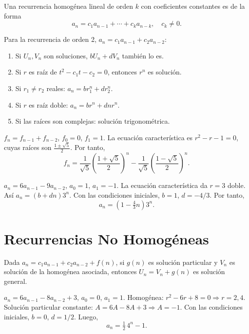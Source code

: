 \begin{definicion}
Una recurrencia homogénea lineal de orden $k$ con coeficientes constantes es de la forma
\[
a_n = c_1 a_{n-1} + \cdots + c_k a_{n-k}, \quad c_k \neq 0.
\]
\end{definicion}

\begin{teorema}
Para la recurrencia de orden 2, $a_n = c_1 a_{n-1} + c_2 a_{n-2}$:
\begin{enumerate}
  \item Si $U_n, V_n$ son soluciones, $bU_n + dV_n$ también lo es.
  \item Si $r$ es raíz de $t^2 - c_1 t - c_2 = 0$, entonces $r^n$ es solución.
  \item Si $r_1 \neq r_2$ reales: $a_n = b r_1^n + d r_2^n$.
  \item Si $r$ es raíz doble: $a_n = b r^n + d n r^n$.
  \item Si las raíces son complejas: solución trigonométrica.
\end{enumerate}
\end{teorema}

\begin{ejemplo}[Fibonacci]
$f_n = f_{n-1} + f_{n-2}$, $f_0 = 0$, $f_1 = 1$. La ecuación característica es $r^2 - r - 1 = 0$, cuyas raíces son $\frac{1 \pm \sqrt{5}}{2}$. Por tanto,
\[
f_n = \frac{1}{\sqrt{5}}\left(\frac{1+\sqrt{5}}{2}\right)^n - \frac{1}{\sqrt{5}}\left(\frac{1-\sqrt{5}}{2}\right)^n.
\]
\end{ejemplo}

\begin{ejemplo}
$a_n = 6a_{n-1} - 9a_{n-2}$, $a_0 = 1$, $a_1 = -1$. La ecuación característica da $r = 3$ doble. Así $a_n = (b + dn)3^n$. Con las condiciones iniciales, $b = 1$, $d = -4/3$. Por tanto,
\[
a_n = \left(1 - \tfrac{4}{3}n\right)3^n.
\]
\end{ejemplo}

\section{Recurrencias No Homogéneas}

\begin{teorema}
Dada $a_n = c_1 a_{n-1} + c_2 a_{n-2} + f(n)$, si $g(n)$ es solución particular y $V_n$ es solución de la homogénea asociada, entonces $U_n = V_n + g(n)$ es solución general.
\end{teorema}

\begin{ejemplo}
$a_n = 6a_{n-1} - 8a_{n-2} + 3$, $a_0 = 0$, $a_1 = 1$.
Homogénea: $r^2 - 6r + 8 = 0 \Rightarrow r = 2, 4$.
Solución particular constante: $A = 6A - 8A + 3 \Rightarrow A = -1$.
Con las condiciones iniciales, $b = 0$, $d = 1/2$. Luego,
\[
a_n = \tfrac{1}{2}\,4^n - 1.
\]
\end{ejemplo}